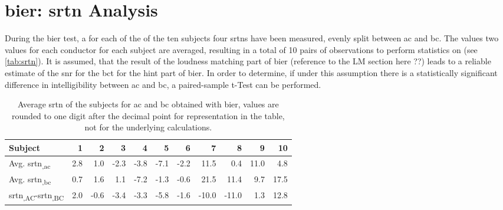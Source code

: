 \section{\gls{bier}: \gls{srtn} Analysis}\label{sec:result_srt}


During the \gls{bier} test, a for each of the of the ten subjects four \gls{srtn}s have been measured, evenly split between \gls{ac} and \gls{bc}.
The values two values for each conductor for each subject are averaged, resulting in a total of 10 pairs of observations to perform statistics on (see \autoref{tab:srtn}).
It is assumed, that the result of the loudness matching part of \gls{bier} (reference to the LM section here ??) leads to a reliable estimate of the \gls{snr} for the \gls{bct} for the \gls{hint} part of \gls{bier}.
In order to determine, if under this assumption there is a statistically significant difference in intelligibility between \gls{ac} and \gls{bc}, a paired-sample t-Test can be performed.\\

\begin{table}[H]
\centering
\caption{Average \gls{srtn} of the subjects for \gls{ac} and \gls{bc} obtained with \gls{bier}, values are rounded to one digit after the decimal point for representation in the table, not for the underlying calculations.}
\label{tab:srtn}
\begin{tabular}{l|rrrrrrrrrr}
Subject     & 1   & 2    & 3    & 4    & 5    & 6    & 7     & 8     & 9    & 10   \\ \hline
Avg. \gls{srtn}\textsubscript{,\gls{ac}} & 2.8 & 1.0  & -2.3 & -3.8 & -7.1 & -2.2 & 11.5  & 0.4   & 11.0 & 4.8  \\
Avg. \gls{srtn}\textsubscript{,\gls{bc}} & 0.7 & 1.6  & 1.1  & -7.2 & -1.3 & -0.6 & 21.5  & 11.4  & 9.7  & 17.5 \\
\gls{srtn}\textsubscript{,AC}-\gls{srtn}\textsubscript{,BC}  & 2.0 & -0.6 & -3.4 & -3.3 & -5.8 & -1.6 & -10.0 & -11.0 & 1.3  & 12.8
\end{tabular}
\end{table}

